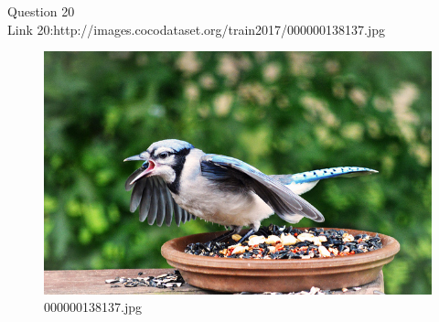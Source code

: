 Question 20\\
Link 20:http://images.cocodataset.org/train2017/000000138137.jpg
    \begin{figure}[h]
        \centering
        \includegraphics[width=0.8\linewidth]{../image set/easy/000000138137.jpg}
        \caption{000000138137.jpg}
    \end{figure}
